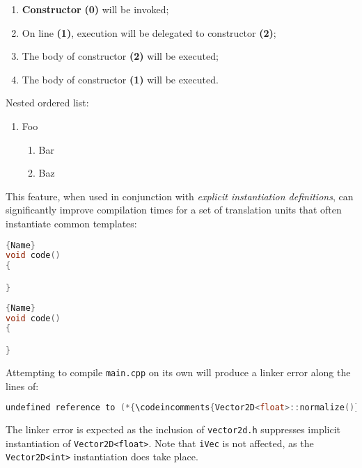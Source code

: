 \documentclass[twoside,10pt,letterpaper,usenames]{newstyle-PearsonGeneric-7-38}
\newcommand{\codeincomments}{\color{skyblue}\ttfamily}
\begin{document}
\begin{enumerate}
\item{\textbf{Constructor} \textbf{(0)} will be invoked;}
\item{On line \textbf{(1)}, execution will be delegated to constructor \textbf{(2)};}
\item{The body of constructor \textbf{(2)} will be executed;}
\item{The body of constructor \textbf{(1)} will be executed.}
\end{enumerate}

Nested ordered list:

\begin{enumerate}
\item{Foo\begin{enumerate}
\item{Bar}
\item{Baz}
\end{enumerate}
}
\end{enumerate}

This feature, when used in conjunction with \emph{explicit instantiation
definitions}, can significantly improve compilation times for a set of
translation units that often instantiate common templates:

\noindent\begin{minipage}{.45\textwidth}
\begin{lstlisting}[language=C++, caption=code 1,frame=tb]{Name}
void code()
{

}
\end{lstlisting}
\end{minipage}\hfill
\begin{minipage}{.45\textwidth}
\begin{lstlisting}[language=C++, caption=code 2,frame=tb]{Name}
void code()
{

}
\end{lstlisting}
\end{minipage}

Attempting to compile \texttt{main.cpp} on its own will produce a linker
error along the lines of:

\begin{lstlisting}[language=C++]
undefined reference to (*{\codeincomments{Vector2D<float>::normalize()}}*)
\end{lstlisting}
    

The linker error is expected as the inclusion of \texttt{vector2d.h}
suppresses implicit instantiation of \texttt{Vector2D<float>}. Note that
\texttt{iVec} is not affected, as the \texttt{Vector2D<int>}
instantiation does take place.
\end{document}
